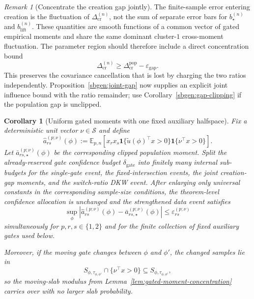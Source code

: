 \documentclass{article} %
\theoremstyle{plain}
\newtheorem{corollary}[theorem]{Corollary}
\theoremstyle{definition}
\theoremstyle{remark}
\newtheorem{remark}[theorem]{Remark}
\begin{document}
\begin{remark}[Concentrate the creation gap jointly]
\label{rem:joint-gap-concentration}
The finite-sample error entering creation is the fluctuation of
$\Delta_{\mathrm{cr}}^{(n)}$, not the sum of separate error bars for
$b_\star^{(n)}$ and $b_{\mathrm{lift}}^{(n)}$.  These quantities are smooth
functions of a common vector of gated empirical moments and share the same
dominant cluster-$1$ cross-moment fluctuation.  The parameter region should
therefore include a direct concentration bound
\[
\boxed{
\Delta_{\mathrm{cr}}^{(n)}
\ge
\Delta_{\mathrm{cr}}^{\mathrm{pop}}
-
\varepsilon_{\mathrm{gap}}.
}
\tag{joint-gap-bound}\label{eq:joint-gap-bound}
\]
This preserves the covariance cancellation that is lost by charging the two
ratios independently. Proposition~\ref{sbgen:joint-gap} now supplies an
explicit joint influence bound with the ratio remainder; use
Corollary~\ref{sbgen:gap-clipping} if the population gap is unclipped.
\end{remark}


\begin{corollary}[Uniform gated moments with one fixed auxiliary halfspace]
\label{cor:fixed-intersection-gated-moments}
Fix a deterministic unit vector $\nu\in\mathcal S$ and define
\[
\widehat a_{rs}^{(p;\nu)}(\phi)
:=
\mathbb E_{p,n}
\left[
x_rx_s
\mathbf 1\{\widetilde u(\phi)^\top x>0\}
\mathbf 1\{\nu^\top x>0\}
\right].
\]
Let $\bar a_{rs,\star}^{(p;\nu)}(\phi)$ be the corresponding clipped
population moment.  Split the already-reserved gate confidence budget
$\delta_{\mathrm{gate}}$ into finitely many internal sub-budgets for the
single-gate event, the fixed-intersection events, the joint creation-gap
moments, and the switch-ratio DKW event. After enlarging only universal
constants in the corresponding sample-size conditions, the theorem-level
confidence allocation is unchanged and the strengthened data event satisfies
\[
\boxed{
\sup_{\phi}
\left|
\widehat a_{rs}^{(p;\nu)}(\phi)
-
\bar a_{rs,\star}^{(p;\nu)}(\phi)
\right|
\le
\varepsilon_{rs}^{(p;\nu)}
}
\tag{fixed-gate-concentration}\label{eq:fixed-gate-concentration}
\]
simultaneously for $p,r,s\in\{1,2\}$ and for the finite collection of fixed
auxiliary gates used below.

Moreover, if the moving gate changes between $\phi$ and $\phi'$, the changed
samples lie in
\[
S_{\phi,\tau_{\phi,\phi'}}\cap\{\nu^\top x>0\}
\subseteq
S_{\phi,\tau_{\phi,\phi'}},
\]
so the moving-slab modulus from
Lemma~\ref{lem:gated-moment-concentration} carries over with no larger slab
probability.
\end{corollary}
\end{document}
